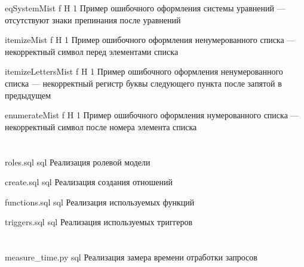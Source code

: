 \begin{appendices}
	{eqSystemMist} %
	{f} %
	{H} %
	{1\textwidth} %
	{Пример ошибочного оформления системы уравнений --- отсутствуют знаки препинания после уравнений} %
	
	{itemizeMist} %
	{f} %
	{H} %
	{1\textwidth} %
	{Пример ошибочного оформления ненумерованного списка --- некорректный символ перед элементами списка} %
	
	{itemizeLettersMist} %
	{f} %
	{H} %
	{1\textwidth} %
	{Пример ошибочного оформления ненумерованного списка --- некорректный регистр буквы следующего пункта после запятой в предыдущем} %
	
	{enumerateMist} %
	{f} %
	{H} %
	{1\textwidth} %
	{Пример ошибочного оформления нумерованного списка --- некорректный символ после номера элемента списка} %
	
	
	\chapter{}
	{roles.sql} %
	{sql} %
	{Реализация ролевой модели} %
	
	{create.sql} %
	{sql} %
	{Реализация создания отношений} %
	
	{functions.sql} %
	{sql} %
	{Реализация используемых функций} %
	
	{triggers.sql} %
	{sql} %
	{Реализация используемых триггеров} %
	
	\chapter{}
	{measure_time.py} %
	{sql} %
	{Реализация замера времени отработки запросов} %
	
	
	
	
	
\end{appendices}
	
	
